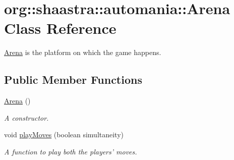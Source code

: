 \hypertarget{classorg_1_1shaastra_1_1automania_1_1Arena}{
\section{\-o\-r\-g\-:\-:\-s\-h\-a\-a\-s\-t\-r\-a\-:\-:\-a\-u\-t\-o\-m\-a\-n\-i\-a\-:\-:\-A\-r\-e\-n\-a \-C\-l\-a\-s\-s \-R\-e\-f\-e\-r\-e\-n\-c\-e}
\label{classorg_1_1shaastra_1_1automania_1_1Arena}
}


\hyperlink{classorg_1_1shaastra_1_1automania_1_1Arena}{Arena} is the platform on which the game happens.  


\subsection*{Public Member Functions}
\begin{DoxyCompactItemize}
\item 
\hypertarget{classorg_1_1shaastra_1_1automania_1_1Arena_ac664986317649a93930e99daff15e253}{
\hyperlink{classorg_1_1shaastra_1_1automania_1_1Arena_ac664986317649a93930e99daff15e253}{\-A\-r\-e\-n\-a} \-(\-)}
\label{classorg_1_1shaastra_1_1automania_1_1Arena_ac664986317649a93930e99daff15e253}

\begin{DoxyCompactList}\small\item\em A constructor. \end{DoxyCompactList}\item 
\-v\-o\-i\-d \hyperlink{classorg_1_1shaastra_1_1automania_1_1Arena_affa73c93fe8845cabe07e8ff5211c14f}{\-p\-l\-a\-y\-M\-o\-v\-e\-s} \-(\-b\-o\-o\-l\-e\-a\-n \-s\-i\-m\-u\-l\-t\-a\-n\-e\-i\-t\-y\-)
\begin{DoxyCompactList}\small\item\em A function to play both the players' moves. \end{DoxyCompactList}\end{DoxyCompactItemize}
